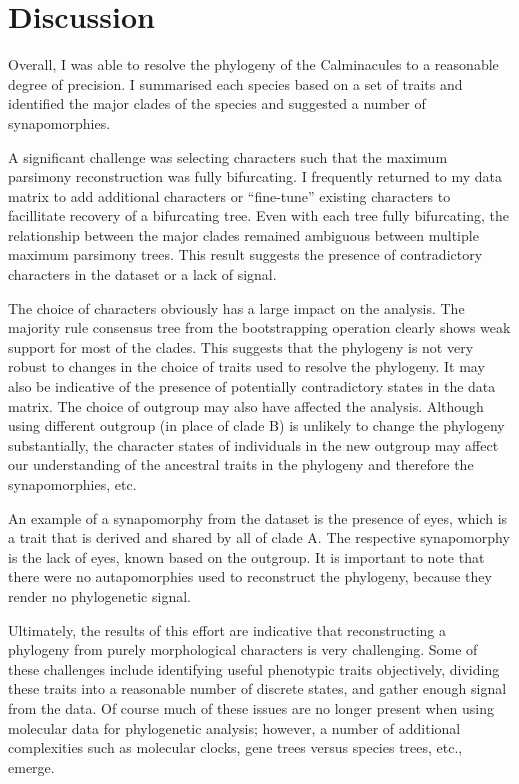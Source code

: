 \documentclass{article}
\begin{document}
    \section*{Discussion}

            Overall, I was able to resolve the phylogeny of the Calminacules to a reasonable degree of precision.
            I summarised each species based on a set of traits and identified the major clades of the species and suggested a number of synapomorphies.

            A significant challenge was selecting characters such that the
                maximum parsimony reconstruction was fully bifurcating.
            I frequently returned to my data matrix to add additional characters or \enquote{fine-tune} existing characters to facillitate recovery of a bifurcating tree.
            Even with each tree fully bifurcating, the relationship between the major clades remained ambiguous between multiple maximum parsimony trees.
            This result suggests the presence of contradictory characters in the dataset or a lack of signal.
            
            The choice of characters obviously has a large impact on the analysis. The majority rule consensus tree from the bootstrapping operation clearly shows weak support for most of the clades. This suggests that the phylogeny is not very robust to changes in the choice of traits used to resolve the phylogeny. It may also be indicative of the presence of potentially contradictory states in the data matrix.
            The choice of outgroup may also have affected the analysis.
            Although using different outgroup (in place of clade B) is unlikely
                to change the phylogeny substantially, the character states of
                individuals in the new outgroup may affect our understanding of
                the ancestral traits in the phylogeny and therefore the
                synapomorphies, etc.
            
            An example of a synapomorphy from the dataset is the presence of eyes, which is a trait that is derived and shared by all of clade A. The respective synapomorphy is the lack of eyes, known based on the outgroup. It is important to note that there were no autapomorphies used to reconstruct the phylogeny, because they render no phylogenetic signal.
            
            Ultimately, the results of this effort are indicative that reconstructing a phylogeny from purely morphological characters is very challenging.
            Some of these challenges include identifying useful phenotypic traits objectively, dividing these traits into a reasonable number of discrete states, and gather enough signal from the data.
            Of course much of these issues are no longer present when using molecular data for phylogenetic analysis; however, a number of additional complexities such as molecular clocks, gene trees versus species trees, etc., emerge.

    \printbibliography
\end{document}
